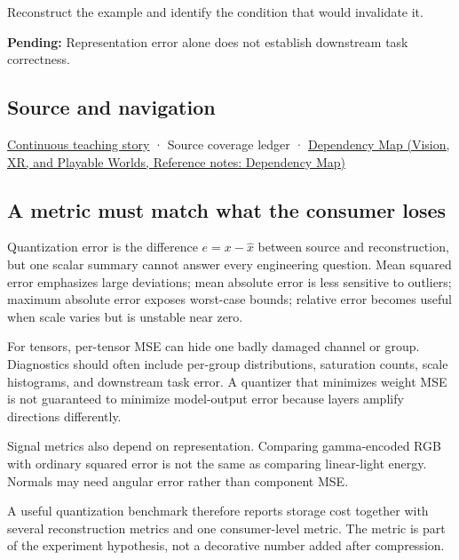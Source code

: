 Reconstruct the example and identify the condition that would invalidate it.

\textbf{Pending:} Representation error alone does not establish downstream task correctness.

\subsection{Source and navigation}\label{appendix-537171d69d27-source-and-navigation}

\hyperref[01-foundations-i-ch001-choosing-what-information-to-keep]{Continuous teaching story} · {Source coverage ledger} · \href{../07-Vision-XR-and-Playable-Worlds/main.pdf\#nameddest=appendix-4ad47bdd269a}{Dependency Map (Vision, XR, and Playable Worlds, Reference notes: Dependency Map)}

\subsection{A metric must match what the consumer loses}\label{appendix-537171d69d27-a-metric-must-match-what-the-consumer-loses}

Quantization error is the difference \(e=x-\hat x\) between source and reconstruction, but one scalar summary cannot answer every engineering question. Mean squared error emphasizes large deviations; mean absolute error is less sensitive to outliers; maximum absolute error exposes worst-case bounds; relative error becomes useful when scale varies but is unstable near zero.

For tensors, per-tensor MSE can hide one badly damaged channel or group. Diagnostics should often include per-group distributions, saturation counts, scale histograms, and downstream task error. A quantizer that minimizes weight MSE is not guaranteed to minimize model-output error because layers amplify directions differently.

Signal metrics also depend on representation. Comparing gamma-encoded RGB with ordinary squared error is not the same as comparing linear-light energy. Normals may need angular error rather than component MSE.

A useful quantization benchmark therefore reports storage cost together with several reconstruction metrics and one consumer-level metric. The metric is part of the experiment hypothesis, not a decorative number added after compression.
